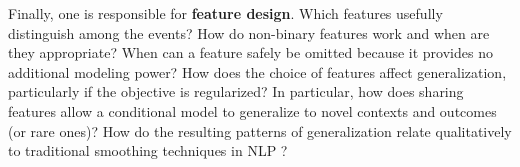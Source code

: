 \documentclass[11pt,letterpaper]{article}
\begin{document}
Finally, one is responsible for \textbf{feature design}.  Which
features usefully distinguish among the events?  How do non-binary
features work and when are they appropriate?  When can a feature
safely be omitted because it provides no additional modeling power?
How does the choice of features affect generalization, particularly if
the objective is regularized?
%
% 
In particular, how does sharing features allow a conditional model to
generalize to novel contexts and outcomes (or rare ones)?  How do the
resulting patterns of generalization relate qualitatively to
traditional smoothing techniques in NLP \cite{chen-goodman-1996}?

\end{document}
